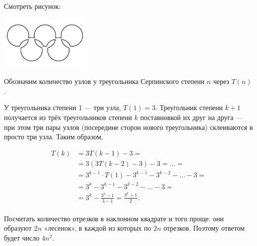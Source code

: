 
\begin{itemize}
\itA Смотреть рисунок:

\begin{multicols}{2}

\begin{center}
	\includegraphics[width=4.4cm]{figures/2018-serpinsky-a}
\end{center}

\columnbreak

\begin{center}  \end{center}

\end{multicols}


\itB Обозначим количество узлов у треугольника Серпинского степени $n$ через $T(n)$.

У треугольника степени 1 — три узла, $T(1)=3$. Треугольник степени $k+1$ получается из  трёх треугольников степени $k$ поставновкой их друг на друга — при этом три пары узлов (посередине сторон нового треугольника) склеиваются в просто три узла. Таким образом,

\begin{align*}
	T(k) & = 3T(k-1) - 3 =\\
	& = 3(3T(k-2)-3)-3 = \ldots = \\
	& = 3^{k-1}\cdot T(1) - 3^{k-1} - 3^{k-2} - \ldots - 3 = \\
	& = 3^k - 3^{k-1} - 3^{k-2} - \ldots - 3 = \\
	& = 3^k - \frac{3^k-1}{3-1} = \frac{3^k+1}{2}. \\
\end{align*}

\vspace{-0.4cm}
Посчитать количество отрезков в наклонном квадрате и того проще: они образуют $2n$ «лесенок», в каждой из которых по $2n$ отрезков. Поэтому ответом будет число $4n^2$.


\end{itemize}
